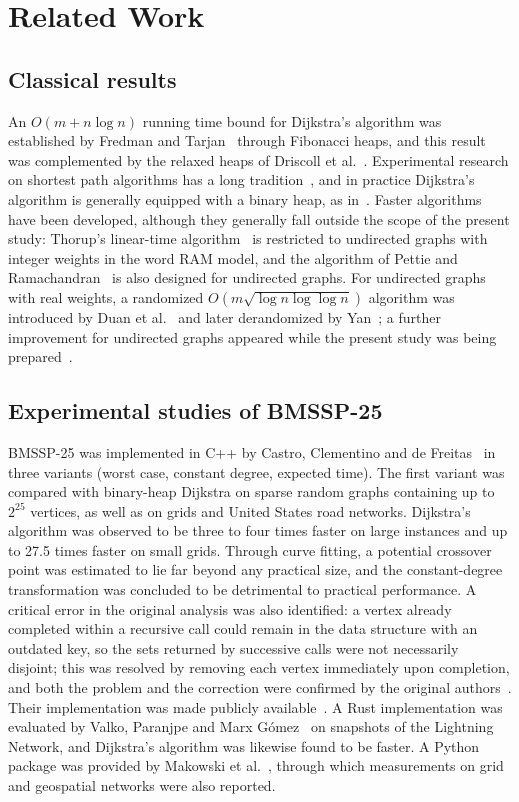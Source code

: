 \documentclass[conference,a4paper]{IEEEtran}
\newcommand{\bmA}{BMSSP-25}
\newcommand{\Oh}{O}
\begin{document}
\section{Related Work}
\subsection{Classical results}
An $\Oh(m+n\log n)$ running time bound for Dijkstra's algorithm was established by Fredman and
Tarjan~\cite{fredman1987} through Fibonacci heaps, and this result was complemented by the
relaxed heaps of Driscoll et al.~\cite{driscoll1988}. Experimental research on shortest path
algorithms has a long tradition~\cite{cherkassky1996}, and in practice Dijkstra's algorithm is
generally equipped with a binary heap, as in~\cite{castro2025}. Faster algorithms have been
developed, although they generally fall outside the scope of the present study: Thorup's
linear-time algorithm~\cite{thorup1999} is restricted to undirected graphs with integer weights
in the word RAM model, and the algorithm of Pettie and Ramachandran~\cite{pettie2005} is also
designed for undirected graphs. For undirected graphs with real weights, a randomized
$\Oh(m\sqrt{\log n\log\log n})$ algorithm was introduced by Duan et al.~\cite{duan2023} and later
derandomized by Yan~\cite{yan2026}; a further improvement for undirected graphs appeared while
the present study was being prepared~\cite{kadria2026}.

\subsection{Experimental studies of \bmA}
\bmA{} was implemented in C++ by Castro, Clementino and de Freitas~\cite{castro2025} in three
variants (worst case, constant degree, expected time). The first variant was compared with
binary-heap Dijkstra on sparse random graphs containing up to $2^{25}$ vertices, as well as on
grids and United States road networks. Dijkstra's algorithm was observed to be three to four
times faster on large instances and up to 27.5 times faster on small grids. Through curve
fitting, a potential crossover point was estimated to lie far beyond any practical size, and the
constant-degree transformation was concluded to be detrimental to practical performance. A
critical error in the original analysis was also identified: a vertex already completed within a
recursive call could remain in the data structure with an outdated key, so the sets returned by
successive calls were not necessarily disjoint; this was resolved by removing each vertex
immediately upon completion, and both the problem and the correction were confirmed by the
original authors~\cite{castro2025}. Their implementation was made publicly available~\cite{bmsspcode}.
A Rust implementation was evaluated by Valko, Paranjpe and Marx G\'omez~\cite{valko2025} on
snapshots of the Lightning Network, and Dijkstra's algorithm was likewise found to be faster. A
Python package was provided by Makowski et al.~\cite{makowski2025}, through which measurements on
grid and geospatial networks were also reported.
\end{document}
